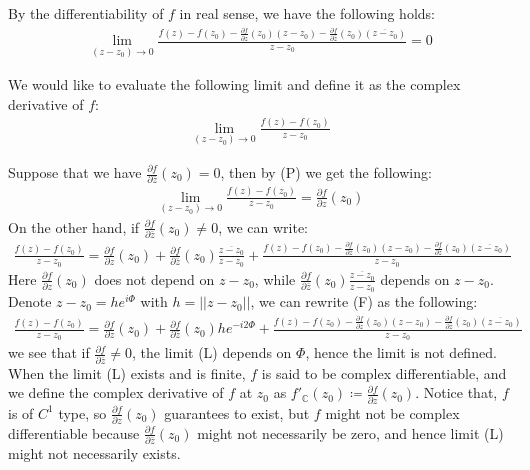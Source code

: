 \documentclass[11pt,oneside]{book}
\theoremstyle{break}
\theoremstyle{break}
\newcommand{\Complex}{\mathbb{C}}
\newcommand{\pd}{\partial}
\begin{document}
By the differentiability of $f$ in real sense, we have the following holds:
\begin{align*}
 \lim_{(z-z_0) \to 0}\frac{f(z) - f(z_0) - \frac{\pd f}{\pd z}(z_0)(z-z_0) - \frac{\pd f}{\pd \bar{z}}(z_0)(\overline{z-z_0}) }{z-z_0} = 0
\tag{P}\end{align*}

We would like to evaluate the following limit and define it as the complex derivative of $f$:
\begin{align*}
\lim_{(z-z_0)\to 0}\frac{f(z) - f(z_0)}{z-z_0} \tag{L}
\end{align*}

Suppose that we have $\frac{\partial f}{\partial \bar{z}}(z_0) =0$, then by (P) we get the following: 
\begin{align*}
\lim_{(z-z_0)\to 0}\frac{f(z) - f(z_0)}{z-z_0} = \frac{\pd f}{\pd z}(z_0)
\end{align*}
On the other hand, if $\frac{\pd f}{\pd \bar{z}}(z_0) \neq 0$, we can write:
\begin{align*}
\frac{f(z)-f(z_0)}{z-z_0}=\frac{\pd f}{\pd z}(z_0) + \frac{\pd f}{\pd \bar{z}}(z_0)\frac{\overline{z-z_0}}{z-z_0}+\frac{f(z) - f(z_0) - \frac{\pd f}{\pd z}(z_0)(z-z_0) - \frac{\pd f}{\pd \bar{z}}(z_0)(\overline{z-z_0}) }{z-z_0}  \tag{F}
\end{align*}
Here $\frac{\pd f}{\pd z}(z_0)$ does not depend on $z-z_0$, while $\frac{\pd f}{\pd \bar{z}}(z_0)\frac{\overline{z-z_0}}{z-z_0} $ depends on $z-z_0$.\\ Denote $z-z_0 = he^{i\Phi}$ with $h = ||z-z_0||$, we can rewrite (F) as the following:
\begin{align*}
\frac{f(z)-f(z_0)}{z-z_0}=\frac{\pd f}{\pd z}(z_0) + \frac{\pd f}{\pd \bar{z}}(z_0)he^{-i2\Phi} +\frac{f(z) - f(z_0) - \frac{\pd f}{\pd z}(z_0)(z-z_0) - \frac{\pd f}{\pd \bar{z}}(z_0)(\overline{z-z_0}) }{z-z_0} 
\end{align*}
we see that if $\frac{\pd f}{\pd \bar{z}}\neq 0$, the limit (L) depends on $\Phi$, hence the limit is not defined.\\

When the limit (L) exists and is finite, $f$ is said to be complex differentiable, and we define the complex derivative of $f$ at $z_0$ as $f'_{\Complex}(z_0)\coloneqq \frac{\pd f}{\pd z}(z_0)$. Notice that, $f$ is of $C^1$ type, so $\frac{\pd f}{\pd z}(z_0)$ guarantees to exist, but $f$ might not be complex differentiable because $\frac{\partial f}{\partial \bar{z}}(z_0)$ might not necessarily be zero, and hence limit (L) might not necessarily exists. 
\end{document}
